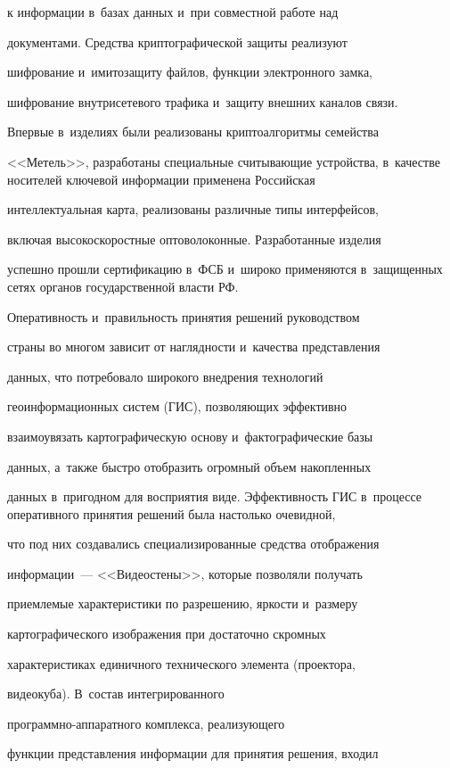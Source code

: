 к информации в~базах данных и~при совместной работе над


документами. Средства криптографической защиты реализуют


шифрование и~имитозащиту файлов, функции электронного замка,


шифрование внутрисетевого трафика и~защиту внешних каналов связи.


Впервые в~изделиях были реализованы криптоалгоритмы семейства


<<Метель>>, разработаны специальные считывающие устройства, в~качестве носителей ключевой информации применена Российская


интеллектуальная карта, реализованы различные типы интерфейсов,


включая высокоскоростные оптоволоконные. Разработанные изделия


успешно прошли сертификацию в~ФСБ и~широко применяются в~защищенных сетях органов государственной власти РФ.





     Оперативность и~правильность принятия решений руководством


страны во многом зависит от наглядности и~качества представления


данных, что потребовало широкого внедрения технологий


геоинформационных систем (ГИС), поз\-во\-ля\-ющих эффективно


взаимоувязать картографическую основу и~фактографические базы


данных, а~также быстро отобразить огромный объем накопленных


данных в~пригодном для восприятия виде. Эффективность ГИС в~процессе оперативного принятия решений была настолько очевидной,


что под них создавались специализированные средства отображения


информации~--- <<Видеостены>>, которые позволяли получать


приемлемые характеристики по разрешению, яркости и~размеру


картографического изображения при достаточно скромных


характеристиках единичного технического элемента (проектора,


видеокуба). В~состав интегрированного


     про\-грам\-мно-ап\-па\-рат\-но\-го комплекса, реализующего


функции представления информации для принятия решения, входил


